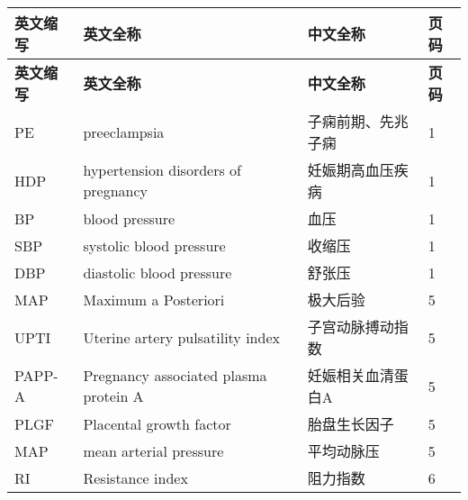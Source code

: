 \cleardoublepage
{}
\begin{center}
    \begin{longtable}{m{2cm}m{7cm}m{5cm}m{1cm}<{\centering}}
        \toprule
        \textbf{英文缩写}&\textbf{英文全称}&\textbf{中文全称}&\textbf{页码}\\
        \midrule
        \endfirsthead
        \toprule
        \textbf{英文缩写}&\textbf{英文全称}&\textbf{中文全称}&\textbf{页码}\\
        \midrule
        \endhead 
        \bottomrule
        \endfoot
        \bottomrule
        \endlastfoot
        PE      &       preeclampsia                                    &   子痫前期、先兆子痫      &   1   \\
        HDP     &       hypertension disorders of pregnancy             &   妊娠期高血压疾病        &   1    \\
        BP     &        blood pressure                         &   血压                 &    1   \\
        SBP     &       systolic blood pressure                         &   收缩压                 &    1   \\
        DBP     &       diastolic blood pressure                         &   舒张压                 &    1   \\
        MAP     &       Maximum a Posteriori                         &   极大后验                 &    5   \\
        UPTI     &       Uterine artery pulsatility index                         &   子宫动脉搏动指数                &    5   \\
        PAPP­-A     &       Pregnancy associated plasma protein A                         &   妊娠相关血清蛋白A                 &    5   \\
        PLGF     &       Placental growth factor                         &   胎盘生长因子                 &    5   \\
        MAP     &   mean arterial pressure                              & 平均动脉压 & 5 \\
        RI      &   Resistance index & 阻力指数 & 6\\

\end{longtable}
\end{center}
